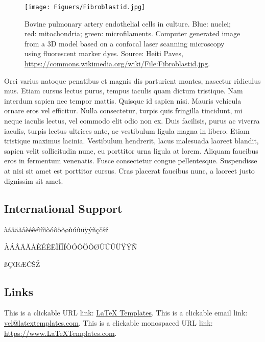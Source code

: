 \documentclass[
a4paper, %
10pt, %
unnumberedsections, %
twoside, %
]{LTJournalArticle}
\begin{document}
	\begin{figure*} %
		\texttt{[image: Figuers/Fibroblastid.jpg]}
		\caption{Bovine pulmonary artery endothelial cells in culture. Blue: nuclei; red: mitochondria; green: microfilaments. Computer generated image from a 3D model based on a confocal laser scanning microscopy using fluorescent marker dyes. Source: Heiti Paves, \href{https://commons.wikimedia.org/wiki/File:Fibroblastid.jpg}{https://commons.wikimedia.org/wiki/File:Fibroblastid.jpg}.}
		\label{fig:bpartery}
	\end{figure*}
	
	Orci varius natoque penatibus et magnis dis parturient montes, nascetur ridiculus mus. Etiam cursus lectus purus, tempus iaculis quam dictum tristique. Nam interdum sapien nec tempor mattis. Quisque id sapien nisi. Mauris vehicula ornare eros vel efficitur. Nulla consectetur, turpis quis fringilla tincidunt, mi neque iaculis lectus, vel commodo elit odio non ex. Duis facilisis, purus ac viverra iaculis, turpis lectus ultrices ante, ac vestibulum ligula magna in libero. Etiam tristique maximus lacinia. Vestibulum hendrerit, lacus malesuada laoreet blandit, sapien velit sollicitudin nunc, eu porttitor urna ligula at lorem. Aliquam faucibus eros in fermentum venenatis. Fusce consectetur congue pellentesque. Suspendisse at nisi sit amet est porttitor cursus. Cras placerat faucibus nunc, a laoreet justo dignissim sit amet.
	
	\subsection{International Support}
	
	\noindent àáâäãåèéêëìíîïòóôöõøùúûüÿýñçčšž
	
	\noindent ÀÁÂÄÃÅÈÉÊËÌÍÎÏÒÓÔÖÕØÙÚÛÜŸÝÑ
	
	\noindent ßÇŒÆČŠŽ
	
	\subsection{Links}
	
	This is a clickable URL link: \href{https://www.latextemplates.com}{LaTeX Templates}. This is a clickable email link: \href{mailto:vel@latextemplates.com}{vel@latextemplates.com}. This is a clickable monospaced URL link: \url{https://www.LaTeXTemplates.com}.
	
	
\end{document}
